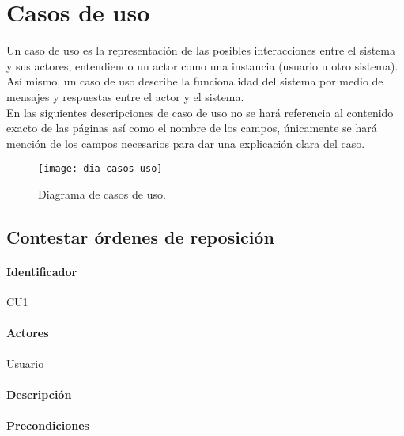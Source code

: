 \section{Casos de uso}
Un caso de uso es la representación de las posibles interacciones entre el sistema y sus actores, entendiendo un actor como una instancia (usuario u otro sistema). Así mismo, un caso de uso describe la funcionalidad del sistema por medio de mensajes y respuestas entre el actor y el sistema\cite{ApressSE}.\\
En las siguientes descripciones de caso de uso no se hará referencia al contenido exacto de las páginas así como el nombre de los campos, únicamente se hará mención de los campos necesarios para dar una explicación clara del caso.

\begin{figure}[h]
\centering
\texttt{[image: dia-casos-uso]} 
\caption{Diagrama de casos de uso.}
\label{fig:dia-casos-uso}
\end{figure}


\subsection{Contestar órdenes de reposición}
\paragraph{Identificador}
CU1
\paragraph{Actores}
Usuario
\paragraph{Descripción}
\paragraph{Precondiciones}
